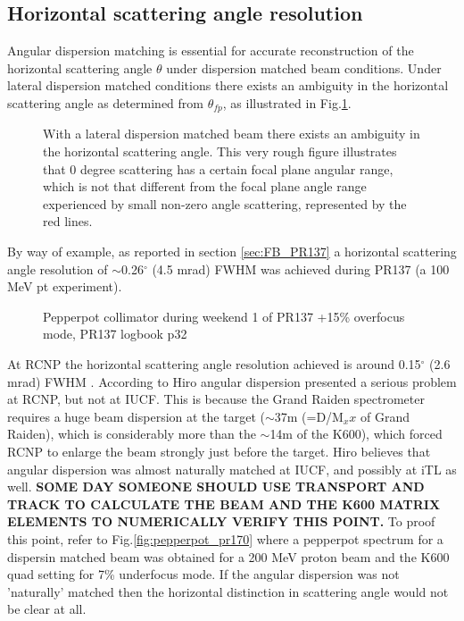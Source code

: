 \documentclass[11pt]{report}
\begin{document}
\subsection{Horizontal scattering angle resolution}
Angular dispersion matching is essential for
accurate reconstruction of the horizontal scattering angle $\theta$ 
under dispersion matched beam conditions.
Under lateral dispersion matched conditions there exists
an ambiguity in the horizontal scattering angle as determined from $\theta_{fp}$,
as illustrated in Fig.\ref{fig:ang-disp-matching}.

\begin{figure}[!h]
\centerline{\vspace{0cm}\hspace{0cm}
}
\centering
\caption{With a lateral dispersion matched beam there exists
an ambiguity in the horizontal scattering angle. This very rough figure illustrates that 
0 degree scattering has a certain focal plane angular range, which is not that different from the
focal plane angle range experienced by small non-zero angle scattering, represented by the red lines. }
\label{fig:ang-disp-matching}
\end{figure} 

By way of example, as reported in section \ref{sec:FB_PR137} 
a horizontal scattering angle resolution of  $\sim$0.26$^{\circ}$ (4.5 mrad) FWHM 
was achieved during PR137 (a 100 MeV pt experiment).

\begin{figure}[!h]
\centerline{\vspace{0cm}\hspace{0cm}
}
\centering
\caption{Pepperpot collimator during weekend 1 of PR137 +15\% overfocus mode, PR137 logbook p32 }
\label{fig:pepperpot_plus15}
\end{figure} 

At RCNP the horizontal scattering angle resolution achieved is around 0.15$^{\circ}$ (2.6 mrad) FWHM \cite{Tam09}.
According to Hiro angular dispersion presented a serious problem at RCNP, but not at IUCF. 
This is because the Grand Raiden spectrometer requires a huge
beam dispersion at the target ($\sim$37m (=D/M$_xx$ of Grand Raiden), which is considerably 
more than the $\sim$14m of the K600), which forced RCNP to enlarge the beam strongly just before the target.
Hiro believes that angular dispersion was almost naturally matched at IUCF, and possibly at iTL as well.
{\bf SOME DAY SOMEONE SHOULD USE TRANSPORT AND TRACK TO CALCULATE THE BEAM AND THE K600 MATRIX ELEMENTS TO
NUMERICALLY VERIFY THIS POINT.} 
To proof this point, refer to Fig.\ref{fig:pepperpot_pr170}
where a pepperpot spectrum for a dispersin matched beam was obtained for a 200 MeV proton beam
and the K600 quad setting for 7\% underfocus mode. If the angular dispersion was not 'naturally' matched
then the horizontal distinction in scattering angle would not be clear at all.
\end{document}
